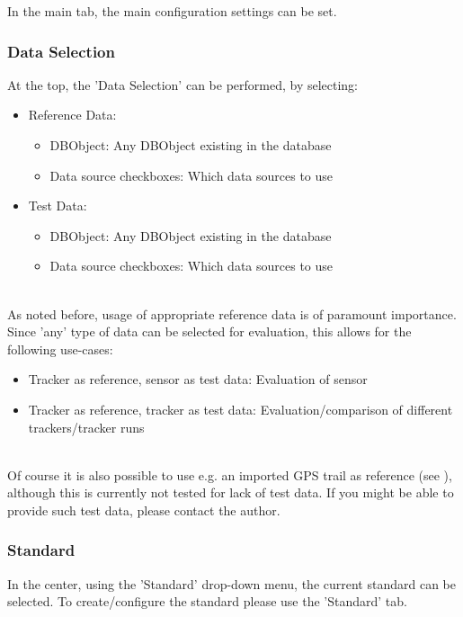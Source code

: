 In the main tab, the main configuration settings can be set. \\

\subsubsection{Data Selection}

At the top, the 'Data Selection' can be performed, by selecting:
\begin{itemize}  
\item Reference Data:
\begin{itemize}  
\item DBObject: Any DBObject existing in the database
\item Data source checkboxes: Which data sources to use
\end{itemize}
\item Test Data:
\begin{itemize}  
\item DBObject: Any DBObject existing in the database
\item Data source checkboxes: Which data sources to use
\end{itemize}
\end{itemize}
\ \\

As noted before, usage of appropriate reference data is of paramount importance. \\

Since 'any' type of data can be selected for evaluation, this allows for the following use-cases:
\begin{itemize}  
\item Tracker as reference, sensor as test data: Evaluation of sensor
\item Tracker as reference, tracker as test data: Evaluation/comparison of different trackers/tracker runs
\end{itemize}
\ \\

Of course it is also possible to use e.g. an imported GPS trail as reference (see ), although this is currently not tested for lack of test data. If you might be able to provide such test data, please contact the author. \\

\subsubsection{Standard}
In the center, using the 'Standard' drop-down menu, the current standard can be selected. To create/configure the standard please use the 'Standard' tab.

